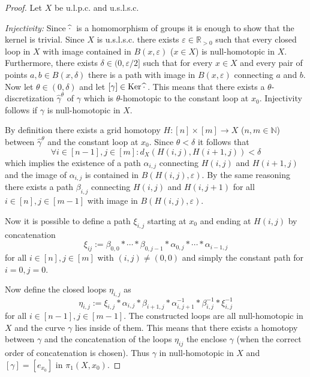 \documentclass[a4paper, 11pt, twoside]{article}
\newcommand{\R}[0]{\mathbb{R}}
\newcommand{\N}[0]{\mathbb{N}}
\theoremstyle{break}
\theoremstyle{break}
\begin{document}
\begin{proof}
  Let $X$ be u.l.p.c. and u.s.l.s.c.

  \textit{Injectivity:} Since $\widehat{\cdot}\hspace*{2px}$ is a homomorphism of groups it is enough to show that the kernel is trivial.
  Since $X$ is u.s.l.s.c. there exists $\varepsilon \in \R_{>0}$ 
  such that every closed loop in $X$ with image contained in $B(x, \varepsilon)$ ($x\in X$) is null-homotopic in $X$. Furthermore,
  there exists $\delta \in (0, \varepsilon/2]$ such that for every $x \in X$ and every pair of points $a,b \in B(x, \delta)$ there is a path with image in $B(x, \varepsilon)$ connecting $a$ and $b$.
  Now let $\theta \in (0, \delta)$ and let $[\gamma] \in {\rm Ker} \hspace*{2px} \widehat{\cdot}\hspace*{2px}$. 
  This means that there exists a $\theta$-discretization $\widehat{\gamma}^{\theta}$ of $\gamma$ which is $\theta$-homotopic to the constant loop at $x_0$.
  Injectivity follows if $\gamma$ is null-homotopic in $X$.
  
  By definition there exists a grid homotopy $H\colon [n] \times [m] \to X$ ($n,m\in\N$) between $\widehat{\gamma}^{\theta}$ and the constant loop at $x_0$.
  Since $\theta < \delta$ it follows that 
  \begin{equation*}
    \forall i \in [n-1], j \in [m]\colon d_X(H(i,j), H(i+1,j)) < \delta
  \end{equation*}
  which implies the existence of a path $\alpha_{i,j}$ connecting $H(i,j)$ and $H(i+1,j)$ and
  the image of $\alpha_{i,j}$ is contained in $B(H(i,j), \varepsilon)$.
  By the same reasoning there exists a path $\beta_{i,j}$ connecting $H(i,j)$ and $H(i,j+1)$ for all $i \in [n], j \in [m-1]$ with image in $B(H(i,j), \varepsilon)$.

  Now it is possible to define a path $\xi_{i,j}$ starting at $x_0$ and ending at $H(i,j)$ by concatenation
  \begin{equation*}
    \xi_{ij} := \beta_{0,0} * \cdots * \beta_{0,j-1} * \alpha_{0,j} * \cdots * \alpha_{i-1,j}
  \end{equation*}
  for all $i \in [n], j \in [m]$ with $(i,j) \neq (0,0)$ and simply the constant path for $i = 0, j = 0$. 
  
  Now define the closed loops $\eta_{i,j}$ as
  \begin{equation*}
    \eta_{i,j} := \xi_{i,j} * \alpha_{i,j} * \beta_{i+1,j} * \alpha^{-1}_{i,j+1} * \beta^{-1}_{i,j} * \xi^{-1}_{i,j}
  \end{equation*}
  for all $i \in [n-1], j \in [m-1]$.
  The constructed loops are all null-homotopic in $X$ and the curve $\gamma$ lies inside of them. 
  This means that there exists a homotopy between $\gamma$ and the concatenation of the loops $\eta_{ij}$ the enclose $\gamma$ (when the correct order of concatenation is chosen).
  Thus $\gamma$ in null-homotopic in $X$ and $[\gamma] = [e_{x_0}]$ in $\pi_1(X, x_0)$.


\end{proof}
\end{document}
